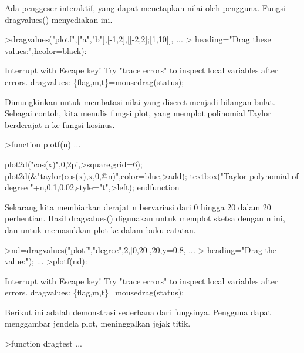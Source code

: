 \begin{eulernotebook}
\begin{eulercomment}
Ada penggeser interaktif, yang dapat menetapkan nilai oleh pengguna.
Fungsi dragvalues() menyediakan ini.
\end{eulercomment}
\begin{eulerprompt}
>dragvalues("plotf",["a","b"],[-1,2],[[-2,2];[1,10]], ...
>  heading="Drag these values:",hcolor=black):
\end{eulerprompt}
\begin{euleroutput}
  Interrupt with Escape key!
  Try "trace errors" to inspect local variables after errors.
  dragvalues:
      \{flag,m,t\}=mousedrag(status);
\end{euleroutput}
\begin{eulercomment}
Dimungkinkan untuk membatasi nilai yang diseret menjadi bilangan
bulat. Sebagai contoh, kita menulis fungsi plot, yang memplot
polinomial Taylor berderajat n ke fungsi kosinus.
\end{eulercomment}
\begin{eulerprompt}
>function plotf(n) ...
\end{eulerprompt}
\begin{eulerudf}
  plot2d("cos(x)",0,2pi,>square,grid=6);
  plot2d(&"taylor(cos(x),x,0,@n)",color=blue,>add);
  textbox("Taylor polynomial of degree "+n,0.1,0.02,style="t",>left);
  endfunction
\end{eulerudf}
\begin{eulercomment}
Sekarang kita membiarkan derajat n bervariasi dari 0 hingga 20 dalam
20 perhentian. Hasil dragvalues() digunakan untuk memplot sketsa
dengan n ini, dan untuk memasukkan plot ke dalam buku catatan.
\end{eulercomment}
\begin{eulerprompt}
>nd=dragvalues("plotf","degree",2,[0,20],20,y=0.8, ...
>   heading="Drag the value:"); ...
>plotf(nd):
\end{eulerprompt}
\begin{euleroutput}
  Interrupt with Escape key!
  Try "trace errors" to inspect local variables after errors.
  dragvalues:
      \{flag,m,t\}=mousedrag(status);
\end{euleroutput}
\begin{eulercomment}
Berikut ini adalah demonstrasi sederhana dari fungsinya. Pengguna
dapat menggambar jendela plot, meninggalkan jejak titik.
\end{eulercomment}
\begin{eulerprompt}
>function dragtest ...
\end{eulerprompt}
\begin{eulerudf}

\end{eulerudf}
\end{eulernotebook}
